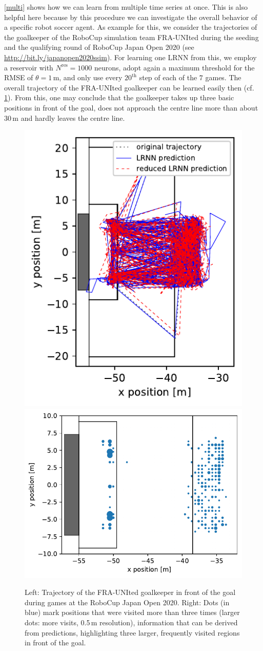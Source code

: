\documentclass[twoside,11pt]{article}
\theoremstyle{definition}
\begin{document}
\cref{multi} shows how we can learn from multiple time series at once. This is
also helpful here because by this procedure we can investigate the overall
behavior of a specific robot soccer agent. As example for this, we consider the
trajectories of the goalkeeper of the RoboCup simulation team FRA-UNIted during
the seeding and the qualifying round of RoboCup Japan Open 2020 (see
\url{http://bit.ly/japanopen2020ssim}). For learning one LRNN from this, we employ a
reservoir with $N^\mathrm{res} = 1000$ neurons, adopt again a maximum threshold
for the RMSE of $\theta = 1$\,m, and only use every $20^\text{th}$ step of each of the
$7$ games. The overall trajectory of the FRA-UNIted goalkeeper can be learned
easily then (cf. \cref{frankfurt}). From this, one may conclude that the
goalkeeper takes up three basic positions in front of the goal, does not
approach the centre line more than about 30\,m and hardly leaves the centre
line.

\begin{figure}
\centering
\hfill %
\includegraphics[width=0.34\columnwidth]{fig/goalie}     %
\hfill %
\includegraphics[width=0.57\columnwidth]{fig/goalievisits} %
\hfill %
\caption{Left: Trajectory of the FRA-UNIted goalkeeper in front of the goal
during games at the RoboCup Japan Open 2020. Right: Dots (in blue) mark positions
that were visited more than three times (larger dots: more visits, 0.5\,m resolution),
information that can be derived from predictions, highlighting three larger,
frequently visited regions in front of the goal.}
\label{frankfurt}
\end{figure}
\end{document}

